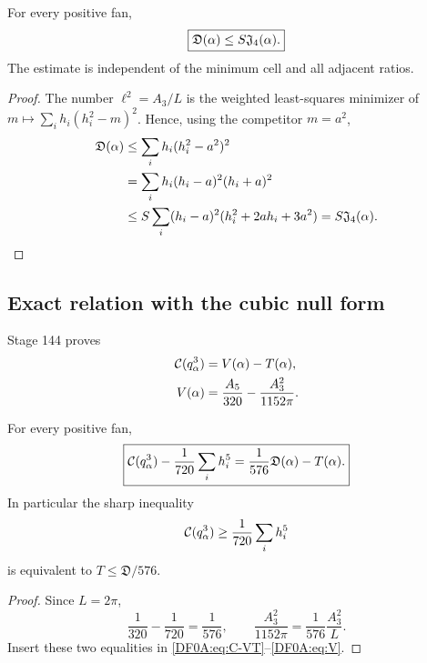 \begin{proposition}
\label{DF0A:prop:D-J}
For every positive fan,
\begin{equation}\label{DF0A:eq:D-J}
 \boxed{\mathfrak D(\alpha)\le S\mathfrak J_4(\alpha).}
\end{equation}
The estimate is independent of the minimum cell and all adjacent ratios.
\end{proposition}

\begin{proof}
The number $\ell^2=A_3/L$ is the weighted least-squares minimizer of
$m\mapsto\sum_i h_i(h_i^2-m)^2$.  Hence, using the competitor $m=a^2$,
\begin{align*}
 \mathfrak D(\alpha)
 &\le\sum_i h_i(h_i^2-a^2)^2\\
 &=\sum_i h_i(h_i-a)^2(h_i+a)^2\\
 &\le S\sum_i(h_i-a)^2(h_i^2+2ah_i+3a^2)
 =S\mathfrak J_4(\alpha).
\end{align*}
\end{proof}

\subsection{Exact relation with the cubic null form}

Stage 144 proves
\begin{align}
 \mathcal C(q_\alpha^3)&=V(\alpha)-T(\alpha),\label{DF0A:eq:C-VT}\\
 V(\alpha)&=\frac{A_5}{320}-\frac{A_3^2}{1152\pi}.
 \label{DF0A:eq:V}
\end{align}

\begin{proposition}
\label{DF0A:prop:defect}
For every positive fan,
\begin{equation}\label{DF0A:eq:defect}
 \boxed{
 \mathcal C(q_\alpha^3)-\frac1{720}\sum_i h_i^5
 =\frac1{576}\mathfrak D(\alpha)-T(\alpha).}
\end{equation}
In particular the sharp inequality
\begin{equation}\label{DF0A:eq:sharp-candidate}
 \mathcal C(q_\alpha^3)\ge\frac1{720}\sum_i h_i^5
\end{equation}
is equivalent to $T\le\mathfrak D/576$.
\end{proposition}

\begin{proof}
Since $L=2\pi$,
\[
 \frac1{320}-\frac1{720}=\frac1{576},
 \qquad
 \frac{A_3^2}{1152\pi}=\frac1{576}\frac{A_3^2}{L}.
\]
Insert these two equalities in \eqref{DF0A:eq:C-VT}--\eqref{DF0A:eq:V}.
\end{proof}

